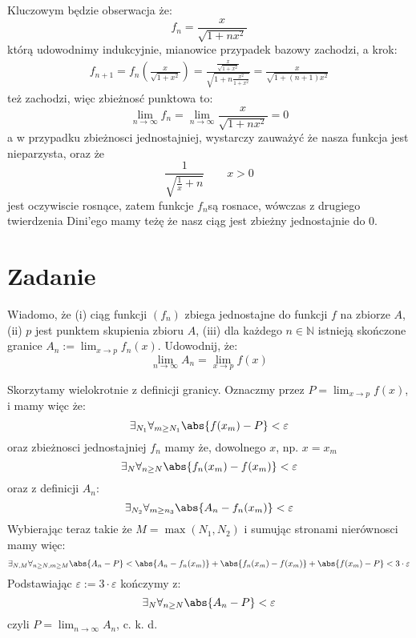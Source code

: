 \documentclass[11pt]{scrartcl}
\begin{document}
      Kluczowym będzie obserwacja że:
      \[
          f_n = \frac{x}{\sqrt{1 + n x^2} }
      \]
      którą udowodnimy indukcyjnie, mianowice przypadek bazowy zachodzi, a krok:
      \begin{gather*}
      f_{n+1} = f_n \left ( \frac{x}{\sqrt{1 + x^2} } \right ) = \frac{\frac{x}{\sqrt{1 + x^2} }}{\sqrt{1+ n \frac{x^2}{1 + x^2 }} } = \frac{x}{\sqrt{1 + (n+1) x^2}}
      \end{gather*}
      też zachodzi, więc zbieżnosć punktowa to:
      \[
          \lim_{n \to \infty } f_n = \lim_{n \to \infty } \frac{x}{\sqrt{1 + nx^2} } = 0   
      \]
      a w przypadku zbieżnosci jednostajniej, wystarczy zauważyć że nasza funkcja jest nieparzysta, oraz że
      \[
        \frac{1}{\sqrt{\frac{1}{x} + n }} \qquad x > 0
      \]
      jest oczywiscie rosnące, zatem funkcje $f_n$są rosnace, wówczas z drugiego twierdzenia Dini'ego mamy teżę że nasz ciąg jest zbieżny jednostajnie do 0.

    \section{Zadanie}
      \begin{zadanie}
          Wiadomo, że (i) ciąg funkcji $(f_n)$ zbiega jednostajne do funkcji $f$ na zbiorze $A$, (ii) $p$ jest punktem skupienia zbioru $A$, (iii) dla każdego $n \in \mathbb{N}$  istnieją skończone granice $A_n := \lim_{x \to p} f_n(x)$. Udowodnij, że:
          \[
              \lim_{n \to \infty } A_n = \lim_{x \to p} f(x)  
          \]
          
      \end{zadanie}

      Skorzytamy wielokrotnie z definicji granicy. Oznaczmy przez $P = \lim_{x \to p} f(x) $, i mamy więc że:
      \[
        \exists_{N_1} \forall_{m \geq N_1} \abs{f(x_m) - P} < \varepsilon 
      \]
      oraz zbieżnosci jednostajniej $f_n$ mamy że, dowolnego $x$, np. $x = x_m$
      \[
        \exists_{N} \forall_{n \geq N} \abs{f_n (x_m) - f(x_m)} < \varepsilon 
      \] 
      oraz z definicji $A_n$:
      \[
        \exists_{N_2} \forall_{m \geq n_3} \abs{A_n - f_n (x_m)} < \varepsilon 
      \]
      Wybierając teraz takie że $M = \max (N_1, N_2)$ i sumując stronami nierównosci mamy więc:
      \[
        \exists_{N, M} \forall_{n \geq N, m \geq M} \abs{A_n - P} < \abs{A_n - f_n (x_m)} + \abs{f_n (x_m) - f(x_m)} + \abs{f(x_m) - P} < 3 \cdot \varepsilon   
      \]
      Podstawiając $\varepsilon := 3 \cdot \varepsilon$ kończymy z:
      \[
        \exists_{N} \forall_{n \geq N} \abs{A_n - P} < \varepsilon 
      \]
      czyli $P = \lim_{n \to \infty } A_n $, c. k. d.
\end{document}

